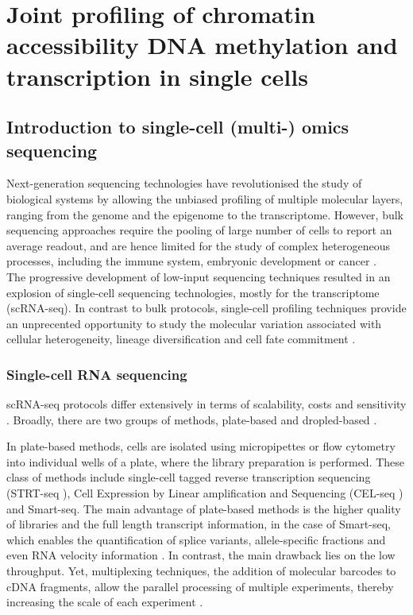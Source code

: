 \graphicspath{{Chapter1/Figs/}}

\chapter{Joint profiling of chromatin accessibility DNA methylation and transcription in single cells}

\section{Introduction to single-cell (multi-) omics sequencing}

Next-generation sequencing technologies have revolutionised the study of biological systems by allowing the unbiased profiling of multiple molecular layers, ranging from the genome\cite{Fleischmann1995} and the epigenome\cite{Frommer1992} to the transcriptome\cite{Lister2008,Bainbridge2006,Nagalakshmi2008,Mortazavi2008}. However, bulk sequencing approaches require the pooling of large number of cells to report an average readout, and are hence limited for the study of complex heterogeneous processes, including the immune system, embryonic development or cancer \cite{Griffiths2018,Papalexi2017,Patel2014}.\\
The progressive development of low-input sequencing techniques resulted in an explosion of single-cell sequencing technologies, mostly for the transcriptome (scRNA-seq). In contrast to bulk protocols, single-cell profiling techniques provide an unprecented opportunity to study the molecular variation associated with cellular heterogeneity, lineage diversification and cell fate commitment \cite{Kolodziejczyk2015}.

\subsection{Single-cell RNA sequencing} \label{section:rna_expresssion}
scRNA-seq protocols differ extensively in terms of scalability, costs and sensitivity \cite{Svensson2018, Lafzi2018}. Broadly, there are two groups of methods, plate-based and dropled-based .

In plate-based methods, cells are isolated using micropipettes or flow cytometry into individual wells of a plate, where the library preparation is performed. These class of methods include single-cell tagged reverse transcription sequencing (STRT-seq \cite{Islam2011}), Cell Expression by Linear amplification and Sequencing (CEL-seq \cite{Hashimshony2012}) and Smart-seq\cite{Ramskold2012, Picelli2014}. The main advantage of plate-based methods is the higher quality of libraries and the full length transcript information, in the case of Smart-seq, which enables the quantification of splice variants\cite{Huang2017}, allele-specific fractions\cite{Deng2014} and even RNA velocity information \cite{LaManno2018}. In contrast, the main drawback lies on the low throughput. Yet, multiplexing techniques, the addition of molecular barcodes to cDNA fragments, allow the parallel processing of multiple experiments, thereby increasing the scale of each experiment \cite{Hashimshony2012}.
	
